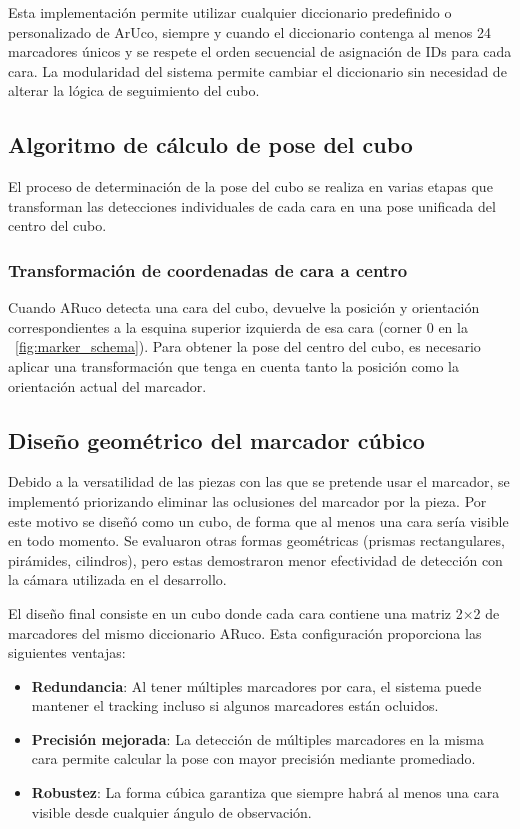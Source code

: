 Esta implementación permite utilizar cualquier diccionario predefinido o personalizado de ArUco, siempre y cuando el diccionario contenga al menos 24 marcadores únicos y se respete el orden secuencial de asignación de IDs para cada cara. La modularidad del sistema permite cambiar el diccionario sin necesidad de alterar la lógica de seguimiento del cubo.

\subsection{Algoritmo de cálculo de pose del cubo}
\label{subsec:algoritmo_pose}

El proceso de determinación de la pose del cubo se realiza en varias etapas que transforman las detecciones individuales de cada cara en una pose unificada del centro del cubo.

\subsubsection{Transformación de coordenadas de cara a centro}
Cuando ARuco detecta una cara del cubo, devuelve la posición y orientación correspondientes a la esquina superior izquierda de esa cara (corner 0 en la \figurename~\ref{fig:marker_schema}). Para obtener la pose del centro del cubo, es necesario aplicar una transformación que tenga en cuenta tanto la posición como la orientación actual del marcador.

\subsection{Diseño geométrico del marcador cúbico}

Debido a la versatilidad de las piezas con las que se pretende usar el marcador, se implementó priorizando eliminar las oclusiones del marcador por la pieza. Por este motivo se diseñó como un cubo, de forma que al menos una cara sería visible en todo momento. Se evaluaron otras formas geométricas (prismas rectangulares, pirámides, cilindros), pero estas demostraron menor efectividad de detección con la cámara utilizada en el desarrollo.

El diseño final consiste en un cubo donde cada cara contiene una matriz 2×2 de marcadores del mismo diccionario ARuco. Esta configuración proporciona las siguientes ventajas:

\begin{itemize}
    \item \textbf{Redundancia}: Al tener múltiples marcadores por cara, el sistema puede mantener el tracking incluso si algunos marcadores están ocluidos.
    \item \textbf{Precisión mejorada}: La detección de múltiples marcadores en la misma cara permite calcular la pose con mayor precisión mediante promediado.
    \item \textbf{Robustez}: La forma cúbica garantiza que siempre habrá al menos una cara visible desde cualquier ángulo de observación.
\end{itemize}

